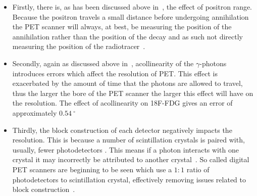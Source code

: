                 \begin{itemize}
                    \item Firstly, there is, as has been discussed above in~, the effect of positron range. Because the positron travels a small distance before undergoing annihilation the \gls{PET} scanner will always, at best, be measuring the position of the annihilation rather than the position of the decay and as such not directly measuring the position of the radiotracer~.

                    \item Secondly, again as discussed above in~, acollinearity of the $\gamma$-photons introduces errors which affect the resolution of \gls{PET}. %
                    This effect is exacerbated by the amount of time that the photons are allowed to travel, thus the larger the bore of the \gls{PET} scanner the larger this effect will have on the resolution. The effect of acollinearity on \gls{18F-FDG} gives an error of approximately $\SI{0.54}{^{\circ}}$~
                    
                    
                    \item Thirdly, the block construction of each detector negatively impacts the resolution. This is because a number of scintillation crystals is paired with, usually, fewer photodetectors%
                    . This means if a photon interacts with one crystal it may incorrectly be attributed to another crystal~. So called digital \gls{PET} scanners are beginning to be seen which use a $1:1$ ratio of photodetectors to scintillation crystal, effectively removing issues related to block construction~.
                    

\end{itemize}
